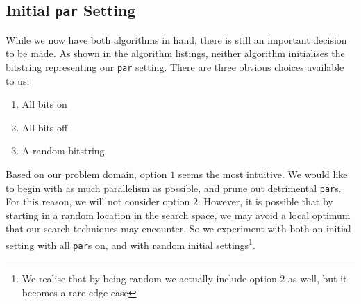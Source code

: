 \subsection{Initial \texttt{par} Setting}

While we now have both algorithms in hand, there is still an important decision
to be made. As shown in the algorithm listings, neither algorithm initialises
the bitstring representing our \verb|par| setting. There are three obvious
choices available to us:

\begin{enumerate}
    \item All bits on
    \item All bits off
    \item A random bitstring
\end{enumerate}

Based on our problem domain, option $1$ seems the most intuitive. We would like
to begin with as much parallelism as possible, and prune out detrimental
\verb|par|s. For this reason, we will not consider option $2$. However, it is
possible that by starting in a random location in the search space, we may
avoid a local optimum that our search techniques may encounter. So we
experiment with both an initial setting with all \verb|par|s on, and with
random initial settings\footnote{We realise that by being random we actually
include option $2$ as well, but it becomes a rare edge-case}.
